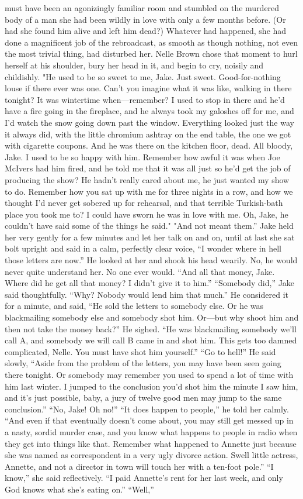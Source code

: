 \documentclass{novel}
\begin{document}
must have been an agonizingly familiar room and stumbled on the murdered body of a man she had been wildly in love with only a few months before. (Or had she found him alive and left him dead?) Whatever had happened, she had done a magnificent job of the rebroadcast, as smooth as though nothing, not even the most trivial thing, had disturbed her. Nelle Brown chose that moment to hurl herself at his shoulder, bury her head in it, and begin to cry, noisily and childishly. "He used to be so sweet to me, Jake. Just sweet. Good-for-nothing louse if there ever was one. Can't you imagine what it was like, walking in there tonight? It was wintertime when—remember? I used to stop in there and he'd have a fire going in the fireplace, and he always took my galoshes off for me, and I'd watch the snow going down past the window. Everything looked just the way it always did, with the little chromium ashtray on the end table, the one we got with cigarette coupons. And he was there on the kitchen floor, dead. All bloody, Jake. I used to be so happy with him. Remember how awful it was when Joe McIvers had him fired, and he told me that it was all just so he'd get the job of producing the show? He hadn't really cared about me, he just wanted my show to do. Remember how you sat up with me for three nights in a row, and how we thought I'd never get sobered up for rehearsal, and that terrible Turkish-bath place you took me to? I could have sworn he was in love with me. Oh, Jake, he couldn't have said some of the things he said." "And not meant them.” Jake held her very gently for a few minutes and let her talk on and on, until at last she sat bolt upright and said in a calm, perfectly clear voice, “I wonder where in hell those letters are now.” He looked at her and shook his head wearily. No, he would never quite understand her. No one ever would. “And all that money, Jake. Where did he get all that money? I didn’t give it to him.” “Somebody did,” Jake said thoughtfully. “Why? Nobody would lend him that much.” He considered it for a minute, and said, “He sold the letters to somebody else. Or he was blackmailing somebody else and somebody shot him. Or—but why shoot him and then not take the money back?” He sighed. “He was blackmailing somebody we’ll call A, and somebody we will call B came in and shot him. This gets too damned complicated, Nelle. You must have shot him yourself.” “Go to hell!” He said slowly, “Aside from the problem of the letters, you may have been seen going there tonight. Or somebody may remember you used to spend a lot of time with him last winter. I jumped to the conclusion you’d shot him the minute I saw him, and it’s just possible, baby, a jury of twelve good men may jump to the same conclusion.” “No, Jake! Oh no!” “It does happen to people,” he told her calmly. “And even if that eventually doesn’t come about, you may still get messed up in a nasty, sordid murder case, and you know what happens to people in radio when they get into things like that. Remember what happened to Annette just because she was named as correspondent in a very ugly divorce action. Swell little actress, Annette, and not a director in town will touch her with a ten-foot pole.” “I know,” she said reflectively. “I paid Annette’s rent for her last week, and only God knows what she’s eating on.” “Well,” 
\end{document}
